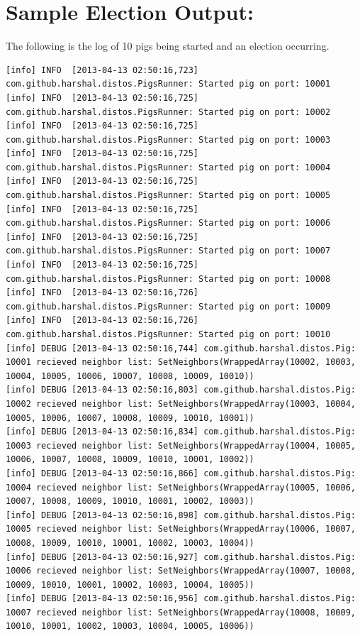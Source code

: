 \documentclass[]{article}
\begin{document}
\section{Sample Election Output:}

The following is the log of 10 pigs being started and an election occurring.
\tiny\begin{verbatim}
[info] INFO  [2013-04-13 02:50:16,723] com.github.harshal.distos.PigsRunner: Started pig on port: 10001
[info] INFO  [2013-04-13 02:50:16,725] com.github.harshal.distos.PigsRunner: Started pig on port: 10002
[info] INFO  [2013-04-13 02:50:16,725] com.github.harshal.distos.PigsRunner: Started pig on port: 10003
[info] INFO  [2013-04-13 02:50:16,725] com.github.harshal.distos.PigsRunner: Started pig on port: 10004
[info] INFO  [2013-04-13 02:50:16,725] com.github.harshal.distos.PigsRunner: Started pig on port: 10005
[info] INFO  [2013-04-13 02:50:16,725] com.github.harshal.distos.PigsRunner: Started pig on port: 10006
[info] INFO  [2013-04-13 02:50:16,725] com.github.harshal.distos.PigsRunner: Started pig on port: 10007
[info] INFO  [2013-04-13 02:50:16,725] com.github.harshal.distos.PigsRunner: Started pig on port: 10008
[info] INFO  [2013-04-13 02:50:16,726] com.github.harshal.distos.PigsRunner: Started pig on port: 10009
[info] INFO  [2013-04-13 02:50:16,726] com.github.harshal.distos.PigsRunner: Started pig on port: 10010
[info] DEBUG [2013-04-13 02:50:16,744] com.github.harshal.distos.Pig: 10001 recieved neighbor list: SetNeighbors(WrappedArray(10002, 10003, 10004, 10005, 10006, 10007, 10008, 10009, 10010))
[info] DEBUG [2013-04-13 02:50:16,803] com.github.harshal.distos.Pig: 10002 recieved neighbor list: SetNeighbors(WrappedArray(10003, 10004, 10005, 10006, 10007, 10008, 10009, 10010, 10001))
[info] DEBUG [2013-04-13 02:50:16,834] com.github.harshal.distos.Pig: 10003 recieved neighbor list: SetNeighbors(WrappedArray(10004, 10005, 10006, 10007, 10008, 10009, 10010, 10001, 10002))
[info] DEBUG [2013-04-13 02:50:16,866] com.github.harshal.distos.Pig: 10004 recieved neighbor list: SetNeighbors(WrappedArray(10005, 10006, 10007, 10008, 10009, 10010, 10001, 10002, 10003))
[info] DEBUG [2013-04-13 02:50:16,898] com.github.harshal.distos.Pig: 10005 recieved neighbor list: SetNeighbors(WrappedArray(10006, 10007, 10008, 10009, 10010, 10001, 10002, 10003, 10004))
[info] DEBUG [2013-04-13 02:50:16,927] com.github.harshal.distos.Pig: 10006 recieved neighbor list: SetNeighbors(WrappedArray(10007, 10008, 10009, 10010, 10001, 10002, 10003, 10004, 10005))
[info] DEBUG [2013-04-13 02:50:16,956] com.github.harshal.distos.Pig: 10007 recieved neighbor list: SetNeighbors(WrappedArray(10008, 10009, 10010, 10001, 10002, 10003, 10004, 10005, 10006))

\end{verbatim}
\end{document}

